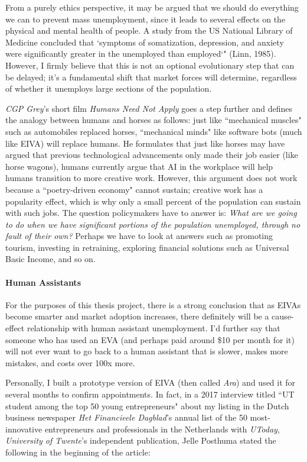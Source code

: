 \documentclass{article}
\begin{document}
From a purely ethics perspective, it may be argued that we should do everything we can to prevent mass unemployment, since it leads to several effects on the physical and mental health of people. A study from the US National Library of Medicine concluded that `symptoms of somatization, depression, and anxiety were significantly greater in the unemployed than employed`" (Linn, 1985). However, I firmly believe that this is not an optional evolutionary step that can be delayed; it's a fundamental shift that market forces will determine, regardless of whether it unemploys large sections of the population.

\emph{CGP Grey}'s short film \emph{Humans Need Not Apply} goes a step further and defines the analogy between humans and horses as follows: just like ``mechanical muscles" such as automobiles replaced horses, ``mechanical minds" like software bots (much like EIVA) will replace humans. He formulates that just like horses may have argued that previous technological advancements only made their job easier (like horse wagons), humans currently argue that AI in the workplace will help humans transition to more creative work. However, this argument does not work because a ``poetry-driven economy" cannot sustain; creative work has a popularity effect, which is why only a small percent of the population can sustain with such jobs. The question policymakers have to answer is: \emph{What are we going to do when we have significant portions of the population unemployed, through no fault of their own?} Perhaps we have to look at answers such as promoting tourism, investing in retraining, exploring financial solutions such as Universal Basic Income, and so on.

\paragraph{Human Assistants}

For the purposes of this thesis project, there is a strong conclusion that as EIVAs become smarter and market adoption increases, there definitely will be a cause-effect relationship with human assistant unemployment. I'd further say that someone who has used an EVA (and perhaps paid around \$10 per month for it) will not ever want to go back to a human assistant that is slower, makes more mistakes, and costs over 100x more.

Personally, I built a prototype version of EIVA (then called \emph{Ara}) and used it for several months to confirm appointments. In fact, in a 2017 interview titled ``UT student among the top 50 young entrepreneurs" about my listing in the Dutch business newspaper \emph{Het Financieele Dagblad}'s annual list of the 50 most-innovative entrepreneurs and professionals in the Netherlands with \emph{UToday}, \emph{University of Twente}'s independent publication, Jelle Posthuma stated the following in the beginning of the article:
\end{document}
